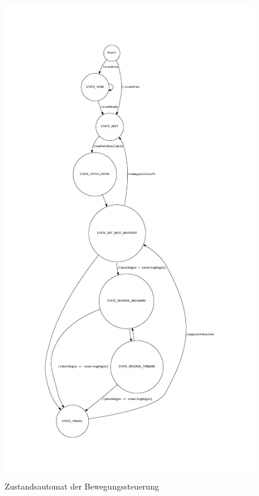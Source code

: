 \begin{figure}[hbtp]
\centering
\includegraphics[scale=1.5]{images/chapter5/StateModel.pdf}
\caption{Zustandsautomat der Bewegungssteuerung}
\label{fig:Zustandsautomat}
\end{figure}
